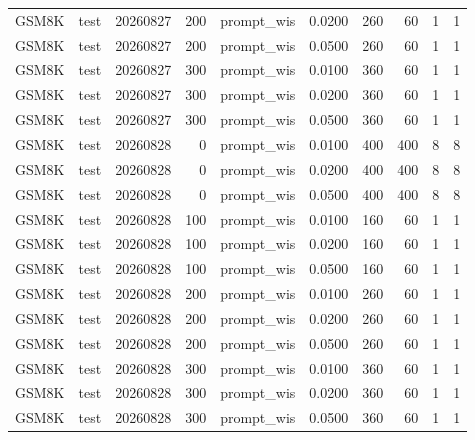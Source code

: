 \begin{table}[t]
\begin{tabular}{lrrrrrrrrr}
GSM8K & test & 20260827 & 200 & prompt\_wis & 0.0200 & 260 & 60 & 1 & 1 \\
GSM8K & test & 20260827 & 200 & prompt\_wis & 0.0500 & 260 & 60 & 1 & 1 \\
GSM8K & test & 20260827 & 300 & prompt\_wis & 0.0100 & 360 & 60 & 1 & 1 \\
GSM8K & test & 20260827 & 300 & prompt\_wis & 0.0200 & 360 & 60 & 1 & 1 \\
GSM8K & test & 20260827 & 300 & prompt\_wis & 0.0500 & 360 & 60 & 1 & 1 \\
GSM8K & test & 20260828 & 0 & prompt\_wis & 0.0100 & 400 & 400 & 8 & 8 \\
GSM8K & test & 20260828 & 0 & prompt\_wis & 0.0200 & 400 & 400 & 8 & 8 \\
GSM8K & test & 20260828 & 0 & prompt\_wis & 0.0500 & 400 & 400 & 8 & 8 \\
GSM8K & test & 20260828 & 100 & prompt\_wis & 0.0100 & 160 & 60 & 1 & 1 \\
GSM8K & test & 20260828 & 100 & prompt\_wis & 0.0200 & 160 & 60 & 1 & 1 \\
GSM8K & test & 20260828 & 100 & prompt\_wis & 0.0500 & 160 & 60 & 1 & 1 \\
GSM8K & test & 20260828 & 200 & prompt\_wis & 0.0100 & 260 & 60 & 1 & 1 \\
GSM8K & test & 20260828 & 200 & prompt\_wis & 0.0200 & 260 & 60 & 1 & 1 \\
GSM8K & test & 20260828 & 200 & prompt\_wis & 0.0500 & 260 & 60 & 1 & 1 \\
GSM8K & test & 20260828 & 300 & prompt\_wis & 0.0100 & 360 & 60 & 1 & 1 \\
GSM8K & test & 20260828 & 300 & prompt\_wis & 0.0200 & 360 & 60 & 1 & 1 \\
GSM8K & test & 20260828 & 300 & prompt\_wis & 0.0500 & 360 & 60 & 1 & 1 \\
\bottomrule
\end{tabular}
\end{table}
